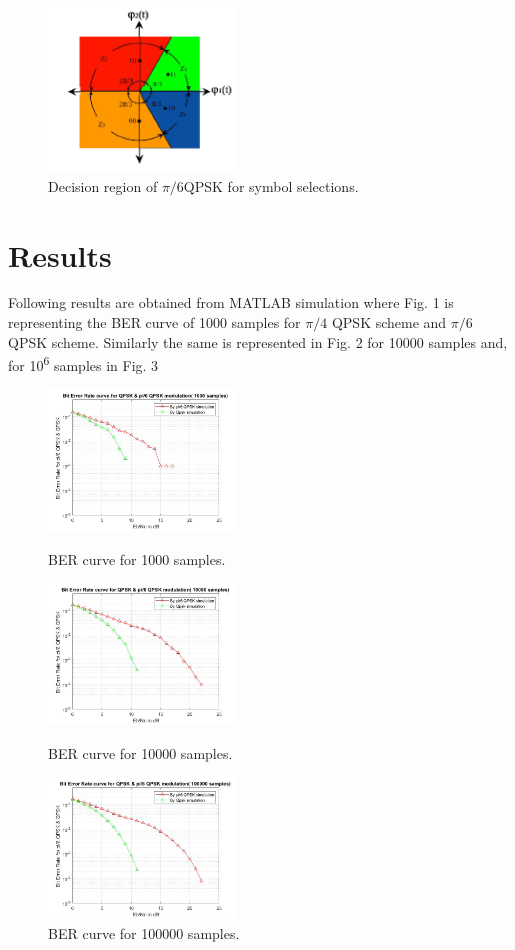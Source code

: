 \documentclass[conference]{IEEEtran}
\begin{document}
\begin{figure}[htbp]
\centerline{\includegraphics[width=5cm]{decision_region.png} }
\caption{Decision region of $\pi/6$QPSK for symbol selections.}
\label{fig2}
\end{figure}

\section{Results}
Following results are obtained from MATLAB simulation where Fig. 1 is representing the BER curve of 1000 samples for $\pi/4$ QPSK scheme and $\pi/6$ QPSK scheme. Similarly the same is represented in Fig. 2 for 10000 samples and, for 10\textsuperscript{6} samples in Fig. 3

\begin{figure}[htbp]
\centerline{\includegraphics[width=5cm]{1.jpg} }
\caption{BER curve for 1000 samples.}
\label{fig1}
\vspace{0.5cm}

\centerline{\includegraphics[width=5cm]{10.jpg} }
\caption{BER curve for 10000 samples.}
\label{fig2}
\vspace{0.5cm}
\centerline{\includegraphics[width=5cm]{100.jpg} }
\caption{BER curve for 100000 samples.}
\label{fig3}
\end{figure}
\end{document}

